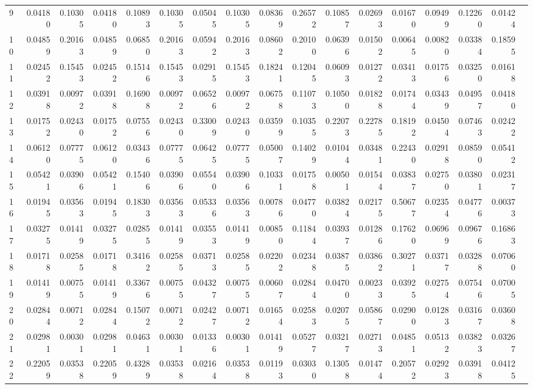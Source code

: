 \documentclass{article}
\begin{document}
\begin{landscape}
\begin{table}[htbp]
\begin{tabular}{lrrrrrrrrrrrrrrrr}
9 & 0.04180 & 0.10305 & 0.04180 & 0.10893 & 0.10305 & 0.05045 & 0.10305 & 0.08369 & 0.26572 & 0.10857 & 0.02693 & 0.01670 & 0.09499 & 0.12260 & 0.01424 \\
10 & 0.04859 & 0.20163 & 0.04859 & 0.06850 & 0.20163 & 0.05942 & 0.20163 & 0.08602 & 0.20100 & 0.06396 & 0.01502 & 0.00645 & 0.00820 & 0.03384 & 0.18595 \\
11 & 0.02452 & 0.15453 & 0.02452 & 0.15146 & 0.15453 & 0.02915 & 0.15453 & 0.18241 & 0.12045 & 0.06093 & 0.01272 & 0.03413 & 0.01756 & 0.03250 & 0.01618 \\
12 & 0.03918 & 0.00972 & 0.03918 & 0.16908 & 0.00972 & 0.06526 & 0.00972 & 0.06758 & 0.11073 & 0.10500 & 0.01828 & 0.01744 & 0.03439 & 0.04957 & 0.04180 \\
13 & 0.01752 & 0.02430 & 0.01752 & 0.07556 & 0.02430 & 0.33009 & 0.02430 & 0.03599 & 0.10355 & 0.22073 & 0.22785 & 0.18192 & 0.04504 & 0.07463 & 0.02422 \\
14 & 0.06120 & 0.07775 & 0.06120 & 0.03436 & 0.07775 & 0.06425 & 0.07775 & 0.05007 & 0.14029 & 0.01044 & 0.03481 & 0.22430 & 0.02918 & 0.08590 & 0.05412 \\
15 & 0.05421 & 0.03906 & 0.05421 & 0.15406 & 0.03906 & 0.05540 & 0.03906 & 0.10331 & 0.01758 & 0.00501 & 0.01544 & 0.03837 & 0.02750 & 0.03801 & 0.02317 \\
16 & 0.01945 & 0.03563 & 0.01945 & 0.18303 & 0.03563 & 0.05336 & 0.03563 & 0.00786 & 0.04770 & 0.03824 & 0.02175 & 0.50677 & 0.02354 & 0.04776 & 0.00373 \\
17 & 0.03275 & 0.01419 & 0.03275 & 0.02855 & 0.01419 & 0.03553 & 0.01419 & 0.00850 & 0.11844 & 0.03937 & 0.01286 & 0.17620 & 0.06969 & 0.09676 & 0.16863 \\
18 & 0.01718 & 0.02585 & 0.01718 & 0.34162 & 0.02585 & 0.03713 & 0.02585 & 0.02202 & 0.02348 & 0.03875 & 0.03862 & 0.30271 & 0.03717 & 0.03288 & 0.07060 \\
19 & 0.01419 & 0.00755 & 0.01419 & 0.33676 & 0.00755 & 0.04327 & 0.00755 & 0.00607 & 0.02844 & 0.04700 & 0.00233 & 0.03925 & 0.02754 & 0.07546 & 0.07005 \\
20 & 0.02844 & 0.00712 & 0.02844 & 0.15072 & 0.00712 & 0.02427 & 0.00712 & 0.01654 & 0.02583 & 0.02075 & 0.05867 & 0.02900 & 0.01283 & 0.03167 & 0.03608 \\
21 & 0.02981 & 0.00301 & 0.02981 & 0.04631 & 0.00301 & 0.01336 & 0.00301 & 0.01419 & 0.05277 & 0.03217 & 0.02713 & 0.04851 & 0.05132 & 0.03823 & 0.03267 \\
22 & 0.22059 & 0.03538 & 0.22059 & 0.43289 & 0.03538 & 0.02164 & 0.03538 & 0.01193 & 0.03030 & 0.13058 & 0.01474 & 0.20572 & 0.02923 & 0.03918 & 0.04125 \\

\end{tabular}
\end{table}
\end{landscape}
\end{document}
